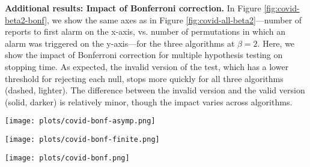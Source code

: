 \textbf{Additional results: Impact of Bonferroni correction.}
In  Figure \ref{fig:covid-beta2-bonf}, we show the same axes as in Figure \ref{fig:covid-all-beta2}---number of reports to first alarm on the x-axis, vs. number of permutations in which an alarm was triggered on the y-axis---for the three algorithms at $\beta=2$. Here, we show the impact of Bonferroni correction for multiple hypothesis testing on stopping time. As expected, the invalid version of the test, which has a lower threshold for rejecting each null, stops more quickly for all three algorithms (dashed, lighter). 
The difference between the invalid version and the valid version (solid, darker) is relatively minor, though the impact varies across algorithms. 

\begin{figure*}[h]
\hfill
\begin{minipage}[c]{0.32\textwidth}
    \texttt{[image: plots/covid-bonf-asymp.png]}
\end{minipage}
\hfill
\begin{minipage}[c]{0.32\textwidth}
    \texttt{[image: plots/covid-bonf-finite.png]}
\end{minipage}
\hfill
\begin{minipage}[c]{0.32\textwidth}
    \texttt{[image: plots/covid-bonf.png]}
\end{minipage}
\hfill
    \caption{\small Impact of multiple hypothesis correction on stopping time across algorithms. As in Figure \ref{fig:covid-all-beta2}, each point on the plot reflects the number of trials (out of 100) in which a rejection has occurred by time $t$. 
    In all plots, the lighter, dashed line reflects stopping time of the invalid test that does not correct for multiple testing; the dark, solid line reflects stopping time of the valid test including a Bonferroni correction. 
    }
    \label{fig:covid-beta2-bonf}
\end{figure*}

